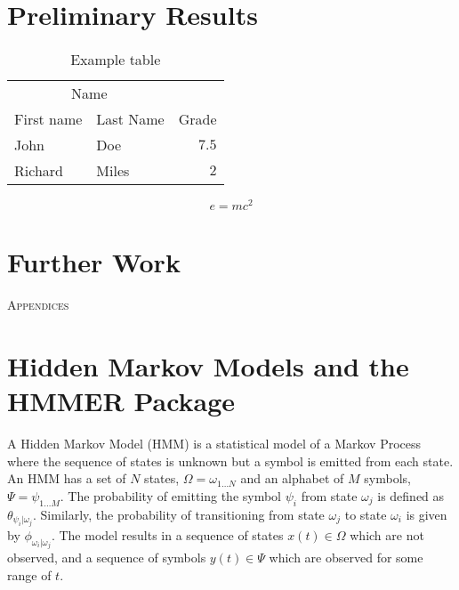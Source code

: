 \documentclass[twoside,a4paper]{article}
\begin{document}
\begin{multicols}{2}

\section{Preliminary Results}

\begin{table}[H]
\caption{Example table}
\centering
\begin{tabular}{llr}
\toprule
\multicolumn{2}{c}{Name} \\
\cmidrule(r){1-2}
First name & Last Name & Grade \\
\midrule
John & Doe & $7.5$ \\
Richard & Miles & $2$ \\
\bottomrule
\end{tabular}
\end{table}

\lipsum[5] %

\begin{equation}
\label{eq:emc}
e = mc^2
\end{equation}

\lipsum[6] %


\section{Further Work}

\lipsum[7-8] %


\begin{center}
  \large\textsc{Appendices}
\end{center}

\appendix

\section{Hidden Markov Models and the HMMER Package}
\label{sec:HMMs}

A Hidden Markov Model (HMM) is a statistical model of a Markov Process where
the sequence of states is unknown but a symbol is emitted from each state. 
An HMM has a set of $N$ states, 
$\Omega = \omega_{1 \ldots N}$ and an alphabet of $M$ symbols, 
$\Psi = \psi_{1 \ldots M}$. 
The probability of emitting the symbol $\psi_i$ from state $\omega_j$ is 
defined as $\theta_{\psi_i | \omega_j}$.
Similarly, the probability of transitioning from state $\omega_j$ to state
$\omega_i$ is given by $\phi_{\omega_i | \omega_j}$.
The model results in a sequence of states $x(t) \in \Omega$ which are not
observed, and a sequence of symbols $y(t) \in \Psi$ which are observed for some
range of $t$.


\end{multicols}
\end{document}
